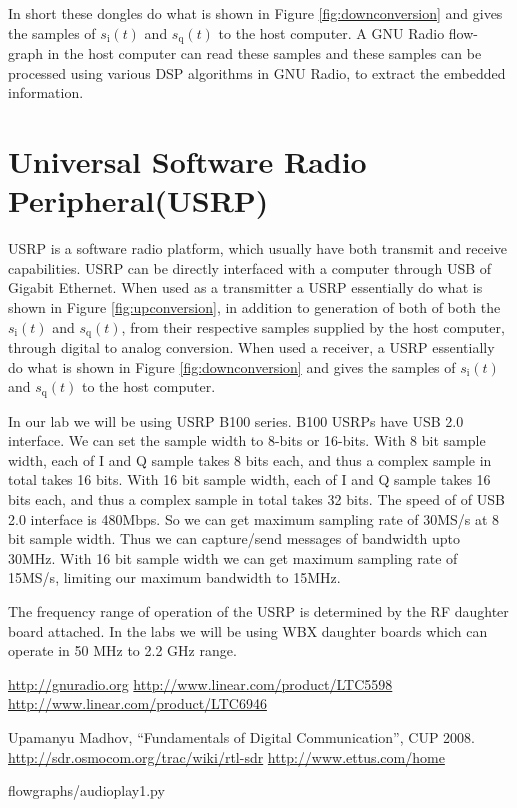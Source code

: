 \documentclass[a4paper,10pt]{article}
\begin{document}
In short these dongles do what is shown in Figure \ref{fig:downconversion}
and gives the samples of $s_{\text{i}}(t)$ and $s_{\text{q}}(t)$ to the host computer.
A GNU Radio flow-graph in the host computer can read these samples and these samples can be processed using various DSP algorithms in GNU Radio,
to extract the embedded information.

\section{Universal Software Radio Peripheral(USRP)\cite{bib:usrp}}
USRP is a software radio platform, which usually have both transmit and receive capabilities.
USRP can be directly interfaced with a computer through USB of Gigabit Ethernet.
When used as a transmitter a USRP essentially do what is shown in Figure \ref{fig:upconversion},
in addition to generation of both of both the $s_{\text{i}}(t)$ and $s_{\text{q}}(t)$,
from their respective samples supplied by the host computer, through digital to analog conversion.
When used a receiver, a USRP essentially do what is shown in Figure \ref{fig:downconversion} and
gives the samples of $s_{\text{i}}(t)$ and $s_{\text{q}}(t)$ to the host computer.

In our lab we will be using USRP B100 series. B100 USRPs have USB 2.0 interface.
We can set the sample width to 8-bits or 16-bits.
With 8 bit sample width, each of I and Q sample takes 8 bits each, and thus a complex sample in total takes 16 bits.
With 16 bit sample width, each of I and Q sample takes 16 bits each, and thus a complex sample in total takes 32 bits.
The speed of of USB 2.0 interface is 480Mbps.
So we can get maximum sampling rate of 30MS/s at 8 bit sample width.
Thus we can capture/send messages of bandwidth upto 30MHz.
With 16 bit sample width we can get maximum sampling rate of 15MS/s,
limiting our maximum bandwidth to 15MHz.

The frequency range of operation of the USRP is determined by the RF daughter board attached.
In the labs we will be using WBX daughter boards which can operate in 50 MHz to 2.2 GHz range.

\newpage
\begin{thebibliography}{9}
 \url{http://gnuradio.org}
 \url{http://www.linear.com/product/LTC5598} 
 \url{http://www.linear.com/product/LTC6946} 
 
  Upamanyu Madhov, ``Fundamentals of Digital Communication'', CUP 2008.
 \url{http://sdr.osmocom.org/trac/wiki/rtl-sdr}
 \url{http://www.ettus.com/home}
 \end{thebibliography}

\newpage
\begin{appendices}

{flowgraphs/audioplay1.py}
\end{appendices}
\end{document}
